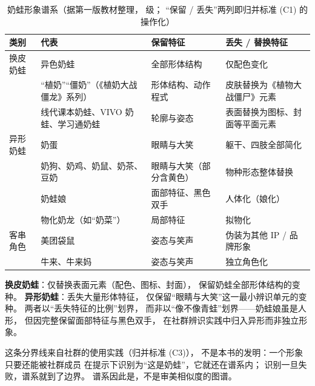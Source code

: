 \begin{table}[htbp]\centering
  \caption{奶蛙形象谱系（据第一版教材整理， 级；
          “保留 / 丢失”两列即归并标准 (C1) 的操作化）}
  \label{tab:06:pedigree}
  \small
  \begin{tabularx}{\textwidth}{@{}llXX@{}}
    \toprule
    类别 & 代表 & 保留特征 & 丢失 / 替换特征 \\ \midrule
    换皮奶蛙 & 异色奶蛙 & 全部形体结构 &
      仅配色变化 \\
    & “植奶”“僵奶”（《植奶大战僵龙》系列） &
      形体结构、动作程式 &
      皮肤替换为《植物大战僵尸》元素 \\
    & 线代课本奶蛙、VIVO 奶蛙、学习通奶蛙 &
      轮廓与姿态 & 表面替换为图标、封面等平面元素 \\
    异形奶蛙 & 奶蛋 & 眼睛与大笑 &
      躯干、四肢全部简化 \\
    & 奶狗、奶鸡、奶鼠、奶茶、豆奶 &
      眼睛与大笑（部分含黄色） & 物种形态整体替换 \\
    & 奶蛙娘 & 面部特征、黑色双手 & 人体化（娘化） \\
    & 物化奶龙（如“奶菜”） & 局部特征 & 拟物化 \\
    客串角色 & 美团袋鼠 & 姿态与笑声 & 伪装为其他 IP / 品牌形象 \\
    & 牛来、牛来妈 & 姿态与笑声 & 独立角色化 \\ \bottomrule
  \end{tabularx}
\end{table}

\begin{definition}\label{def:06:reskin}
  \textbf{换皮奶蛙}：仅替换表面元素（配色、图标、封面），
  保留奶蛙全部形体结构的变种。
  \textbf{异形奶蛙}：丢失大量形体特征，
  仅保留“眼睛与大笑”这一最小辨识单元的变种。
  两者以“丢失特征的比例”划界，
  而非以“像不像青蛙”划界——奶蛙娘虽是人形，
  但因完整保留面部特征与黑色双手，
  在社群辨识实践中归入异形而非独立形象。
\end{definition}

这条分界线来自社群的使用实践（归并标准 (C3)），
不是本书的发明：一个形象只要还能被社群成员
在提示下识别为“这是奶蛙”，它就还在谱系内；
识别一旦失败，谱系就到了边界。
谱系因此是，不是审美相似度的图谱。

